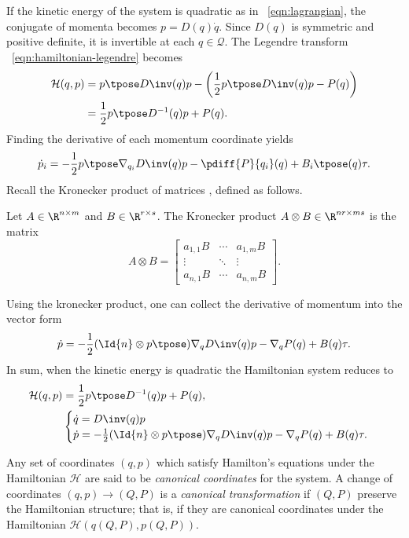 If the kinetic energy of the system is quadratic as in ~\eqref{eqn:lagrangian}, 
the conjugate of momenta becomes \(p = D(q)\dot{q}\). Since \(D(q)\) is symmetric
and positive definite, it is invertible at each \(q \in \mathcal{Q}\).
The Legendre transform ~\eqref{eqn:hamiltonian-legendre} becomes
\begin{align*}
    \mathcal{H}(q,p) &= p\tpose D\inv(q)p - \left( \frac{1}{2}p\tpose D\inv(q) p -
    P(q) \right) \\
         &= \frac{1}{2} p\tpose D^{-1}(q) p + P(q)
    .
\end{align*}
Finding the derivative of each momentum coordinate yields
\[
    \dot{p}_i = -\frac{1}{2} p\tpose \nabla_{q_i}D\inv(q) p 
        - \pdiff{P}{q_i}(q) + B_i\tpose(q) \tau
    .
\]
Recall the Kronecker product of matrices \cite{kronprod}, defined as follows.
\begin{defn}
    Let \(A \in \R^{n \times m}\) and \(B \in \R^{r \times s}\).
    The Kronecker product \(A \otimes B \in \R^{nr \times ms}\) is the  matrix
    \[
        A \otimes B = \begin{bmatrix}
            a_{1,1}B & \cdots & a_{1,m} B \\
            \vdots & \ddots & \vdots \\
            a_{n,1} B & \cdots & a_{n,m} B
        \end{bmatrix} 
        .
    \]
\end{defn}
Using the kronecker product, one can collect the derivative of momentum into
the vector form
\[
    \dot{p} = -\frac{1}{2} (\Id{n} \otimes p\tpose) \nabla_q D\inv(q) p
    - \nabla_q P(q) + B(q) \tau
    .
\]
In sum, when the kinetic energy is quadratic the Hamiltonian system reduces to
\begin{align}\label{eqn:hamiltonian}
    \mathcal{H}(q,p) &= \frac{1}{2} p\tpose D^{-1}(q) p + P(q)
    , \\
     &\begin{cases}
        \dot{q} = D\inv(q)p \\
        \dot{p} = -\frac{1}{2} (\Id{n} \otimes p\tpose) \nabla_q D\inv(q) p
        - \nabla_q P(q) + B(q) \tau
        . \\
    \end{cases} \label{eqn:hamiltonian-full-dynamics}
\end{align}

Any set of coordinates \((q,p)\) which satisfy Hamilton's equations 
under the Hamiltonian \(\mathcal{H}\) are
said to be \textit{canonical coordinates} for the system. A change of
coordinates \((q,p) \rightarrow (Q,P)\) is a \textit{canonical
transformation} if \((Q,P)\) preserve the Hamiltonian structure; that is, if
they are canonical coordinates under the Hamiltonian
\(\mathcal{H}\left(q(Q,P), p(Q,P)\right)\).

